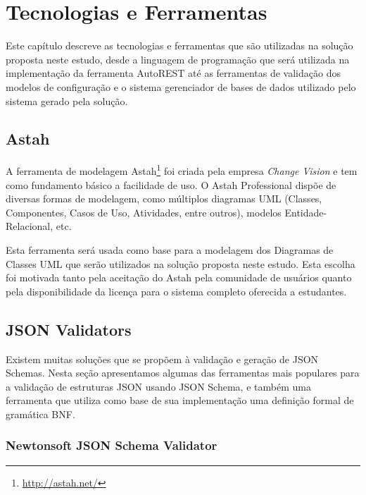 \chapter{Tecnologias e Ferramentas}
\label{chap:tecno}

Este capítulo descreve as tecnologias e ferramentas que são utilizadas na solução proposta neste estudo, desde a linguagem de programação que será utilizada na implementação da ferramenta AutoREST até as ferramentas de validação dos modelos de configuração e o sistema gerenciador de bases de dados utilizado pelo sistema gerado pela solução.


\section{Astah}

A ferramenta de modelagem Astah\footnote{\url{http://astah.net/}} foi criada pela empresa \textit{Change Vision} e tem como fundamento básico a facilidade de uso. O Astah Professional dispõe de diversas formas de modelagem, como múltiplos diagramas UML (Classes, Componentes, Casos de Uso, Atividades, entre outros), modelos Entidade-Relacional, etc.

Esta ferramenta será usada como base para a modelagem dos Diagramas de Classes UML que serão utilizados na solução proposta neste estudo. Esta escolha foi motivada tanto pela aceitação do Astah pela comunidade de usuários quanto pela disponibilidade da licença para o sistema completo oferecida a estudantes.


\section{JSON Validators}

Existem muitas soluções que se propõem à validação e geração de JSON Schemas. Nesta seção apresentamos algumas das ferramentas mais populares para a validação de estruturas JSON usando JSON Schema, e também uma ferramenta que utiliza como base de sua implementação uma definição formal de gramática BNF.


\subsection{Newtonsoft JSON Schema Validator}

